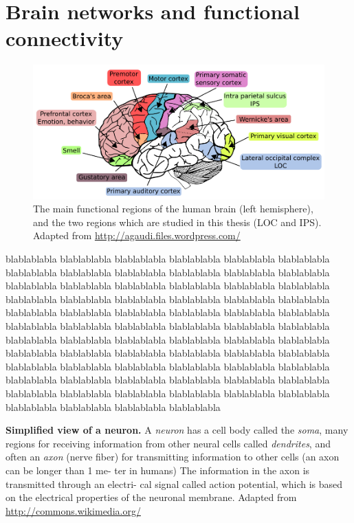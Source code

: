 \section{Brain networks and functional connectivity}
\begin{figure}[!htpb]
  \includegraphics[width=1\linewidth]{figures/brain_function.png}
  \caption{The main functional regions of the human brain (left hemisphere),
and the two regions which are studied in this thesis (LOC and IPS). Adapted
from \url{http://agaudi.files.wordpress.com/}}
\end{figure}
blablablabla
blablablabla
blablablabla
blablablabla
blablablabla
blablablabla
blablablabla
blablablabla
blablablabla
blablablabla
blablablabla
blablablabla
blablablabla
blablablabla
blablablabla
blablablabla
blablablabla
blablablabla
blablablabla
blablablabla
blablablabla
blablablabla
blablablabla
blablablabla
blablablabla
blablablabla
blablablabla
blablablabla
blablablabla
blablablabla
blablablabla
blablablabla
blablablabla
blablablabla
blablablabla
blablablabla
blablablabla
blablablabla
blablablabla
blablablabla
blablablabla
blablablabla
blablablabla
blablablabla
blablablabla
blablablabla
blablablabla
blablablabla
blablablabla
blablablabla
blablablabla
blablablabla
blablablabla
blablablabla
blablablabla
blablablabla
blablablabla
blablablabla
blablablabla
blablablabla
blablablabla
blablablabla
blablablabla
blablablabla
blablablabla
blablablabla
blablablabla
blablablabla
blablablabla
blablablabla
\begin{marginfigure}
    \centering
    \def\svgwidth{\columnwidth}
    
    \caption{\textbf{Simplified view of a neuron.} A \textit{neuron} has a cell body
called the \textit{soma}, many regions for receiving information from other neural cells
called \textit{dendrites}, and often an \textit{axon} (nerve
fiber) for transmitting information to other
cells (an axon can be longer than 1 me-
ter in humans) The information in the
axon is transmitted through an electri-
cal signal called action potential, which
is based on the electrical properties of
the neuronal membrane. Adapted from
\url{http://commons.wikimedia.org/}}
\end{marginfigure}

